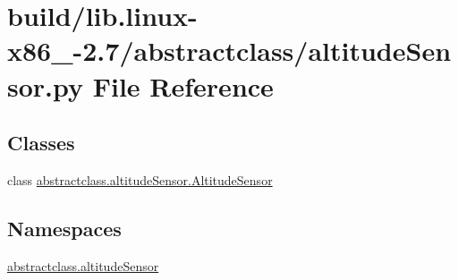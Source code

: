 \hypertarget{build_2lib_8linux-x86__64-2_87_2abstractclass_2altitudeSensor_8py}{}\section{build/lib.linux-\/x86\+\_-\/2.7/abstractclass/altitude\+Sensor.py File Reference}
\label{build_2lib_8linux-x86__64-2_87_2abstractclass_2altitudeSensor_8py}
\subsection*{Classes}
\begin{DoxyCompactItemize}
\item 
class \hyperlink{classabstractclass_1_1altitudeSensor_1_1AltitudeSensor}{abstractclass.\+altitude\+Sensor.\+Altitude\+Sensor}
\end{DoxyCompactItemize}
\subsection*{Namespaces}
\begin{DoxyCompactItemize}
\item 
 \hyperlink{namespaceabstractclass_1_1altitudeSensor}{abstractclass.\+altitude\+Sensor}
\end{DoxyCompactItemize}
